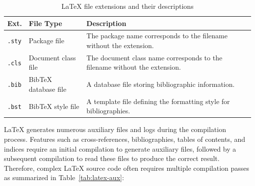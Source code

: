 \begin{table}[htbp]
    \centering
    \small
    \setlength{\tabcolsep}{3pt}
    \caption{\LaTeX{} file extensions and their descriptions}
    \label{tab:latex-ext}
    \begin{tabular}{p{1cm} p{2.2cm} p{3.8cm}}
        \toprule
        \textbf{Ext.} & \textbf{File Type}   & \textbf{Description}                                                       \\
        \midrule
        \texttt{.sty}           & Package file         & The package name corresponds to the filename without the extension.        \\
        \texttt{.cls}           & Document class file  & The document class name corresponds to the filename without the extension. \\
        \texttt{.bib}           & BibTeX database file & A database file storing bibliographic information.                         \\
        \texttt{.bst}           & BibTeX style file    & A template file defining the formatting style for bibliographies.          \\
        \bottomrule
    \end{tabular}
\end{table}

\LaTeX{} generates numerous auxiliary files and logs during the compilation process. Features such as cross-references, bibliographies, tables of contents, and indices require an initial compilation to generate auxiliary files, followed by a subsequent compilation to read these files to produce the correct result. Therefore, complex \LaTeX{} source code often requires multiple compilation passes as summarized in Table~\ref{tab:latex-aux}:


